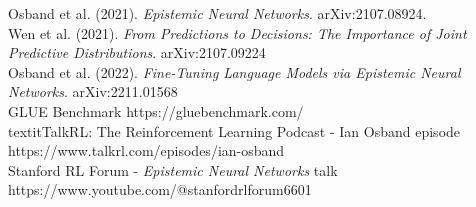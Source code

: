 \documentclass[preview]{standalone}
\begin{document}
Osband et al. (2021). \textit{Epistemic Neural Networks}. arXiv:2107.08924.\\Wen et al. (2021). \textit{From Predictions to Decisions: The Importance of Joint Predictive Distributions}. arXiv:2107.09224\\Osband et al. (2022). \textit{Fine-Tuning Language Models via Epistemic Neural Networks}. arXiv:2211.01568\\GLUE Benchmark https://gluebenchmark.com/\\textit{TalkRL: The Reinforcement Learning Podcast} - Ian Osband episode https://www.talkrl.com/episodes/ian-osband\\Stanford RL Forum - \textit{Epistemic Neural Networks} talk https://www.youtube.com/@stanfordrlforum6601\\
\end{document}
